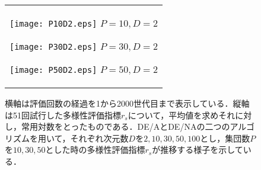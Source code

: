 \documentclass[a4paper,11pt,oneside,openany]{jsbook}
\begin{document}
\newpage
\begin{figure}[htbp]
  \caption{横軸は評価回数の経過を1から2000世代目まで表示している．縦軸は51回試行した多様性評価指標$r_s$について，平均値を求めそれに対し，常用対数をとったものである．DE/AとDE/NAの二つのアルゴリズムを用いて，それぞれ次元数$D$を$2,10,30,50,100$とし，集団数$P$を$10,30,50$とした時の多様性評価指標$r_s$が推移する様子を示している．}
  \begin{center}
    \begin{tabular}{c}
      \begin{minipage}{0.33\hsize}
        \begin{center}
          \texttt{[image: P10D2.eps]}
          \hspace{1.2cm}$P=10, D=2
 $       \end{center}
      \end{minipage}

      \begin{minipage}{0.33\hsize}
        \begin{center}
          \texttt{[image: P30D2.eps]}
          \hspace{1.2cm}$P=30, D=2
 $       \end{center}
      \end{minipage}

      \begin{minipage}{0.33\hsize}
        \begin{center}
          \texttt{[image: P50D2.eps]}
          \hspace{1.2cm}$P=50, D=2
 $       \end{center}
      \end{minipage}
    \end{tabular}
  \end{center}
\end{figure}
\end{document}
